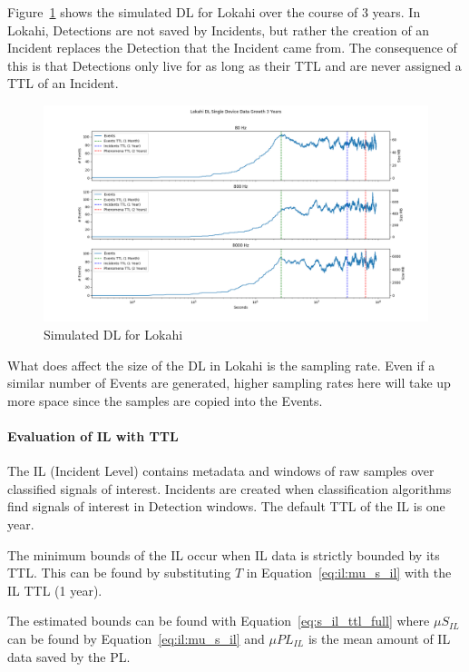 Figure~\ref{fig:sim_dl_lokahi} shows the simulated DL for Lokahi over the course of 3 years. In Lokahi, Detections are not saved by Incidents, but rather the creation of an Incident replaces the Detection that the Incident came from. The consequence of this is that Detections only live for as long as their TTL and are never assigned a TTL of an Incident.

\begin{figure}[H]
	\centering
	\includegraphics[width=\linewidth]{figures/sim_dl_lokahi.png}
	\caption{Simulated DL for Lokahi}
	\label{fig:sim_dl_lokahi}
\end{figure}

What does affect the size of the DL in Lokahi is the sampling rate. Even if a similar number of Events are generated, higher sampling rates here will take up more space since the samples are copied into the Events.

\paragraph{Evaluation of IL with TTL}

The IL (Incident Level) contains metadata and windows of raw samples over classified signals of interest. Incidents are created when classification algorithms find signals of interest in Detection windows. The default TTL of the IL is one year.

The minimum bounds of the IL occur when IL data is strictly bounded by its TTL. This can be found by substituting $T$ in Equation~\ref{eq:il:mu_s_il} with the IL TTL (1 year).

The estimated bounds can be found with Equation~\ref{eq:s_il_ttl_full} where $\mu S_{IL}$ can be found by Equation~\ref{eq:il:mu_s_il} and $\mu PL_{IL}$ is the mean amount of IL data saved by the PL\@.


